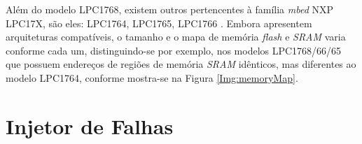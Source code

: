 Além do modelo LPC1768, existem outros pertencentes à família \textit{mbed} NXP LPC17X, são eles: LPC1764, LPC1765, LPC1766 \cite{manualLpc176x:2016}. Embora apresentem arquiteturas compatíveis, o tamanho e o mapa de memória \textit{flash} e \textit{SRAM} varia conforme cada um, distinguindo-se por exemplo, nos modelos LPC1768/66/65 que possuem endereços de regiões de memória \textit{SRAM} idênticos, mas diferentes ao modelo LPC1764, conforme mostra-se na Figura \ref{Img:memoryMap}.





\section{Injetor de Falhas} \label{sec:InjetorDeFalhas}

